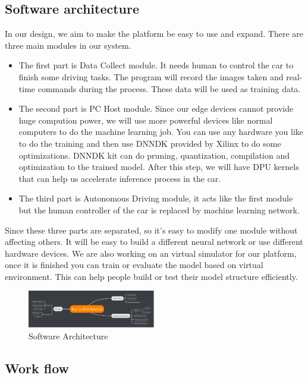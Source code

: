 \documentclass[conference]{IEEEtran}
\begin{document}
\subsection{Software architecture}\label{AA}

In our design, we aim to make the platform be easy to use and expand. There are three main modules in our system.

\begin{itemize}
\item The first part is Data Collect module. It needs human to control the car to finish some driving tasks. The program will record the images taken and real-time commands during the process. These data will be used as training data.
\item The second part is PC Host module. Since our edge devices cannot provide huge compution power, we will use more powerful devices like normal computers to do the machine learning job. You can use any hardware you like to do the training and then use DNNDK provided by Xilinx to do some optimizations. DNNDK kit can do pruning, quantization, compilation and optimization to the trained model. After this step, we will have DPU kernels that can help us accelerate inference process in the car.
\item The third part is Autonomous Driving module, it acts like the first module but the human controller of the car is replaced by machine learning network.
\end{itemize}

Since these three parts are separated, so it's easy to modify one module without affecting others. It will be easy to build a different neural network or use different hardware devices. We are also working on an virtual simulator for our platform, once it is finished you can train or evaluate the model based on virtual environment. This can help people build or test their model structure efficiently.
\begin{figure}[htbp]
\centerline{\includegraphics[width=0.5\textwidth]{software-architecture.jpg}}
\caption{Software Architecture}
\label{sa}
\end{figure}

\subsection{Work flow}
\end{document}
